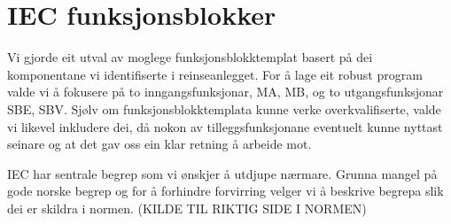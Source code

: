 \section{IEC funksjonsblokker} \label{IEC Seksjon}
\thispagestyle{fancy}

Vi gjorde eit utval av moglege funksjonsblokktemplat basert på dei komponentane vi identifiserte i reinseanlegget.
For å lage eit robust program valde vi å fokusere på to inngangsfunksjonar, \gls{MA}, \gls{MB}, og to utgangsfunksjonar \gls{SBE}, \gls{SBV}.
Sjølv om funksjonsblokktemplata kunne verke overkvalifiserte, valde vi likevel inkludere dei, då nokon av tilleggsfunksjonane eventuelt kunne nyttast seinare
og at det gav oss ein klar retning å arbeide mot.

\gls{IEC} har sentrale begrep som vi ønskjer å utdjupe nærmare. Grunna mangel på gode norske begrep
og for å forhindre forvirring velger vi å beskrive begrepa slik dei er skildra i normen. (KILDE TIL RIKTIG SIDE I NORMEN)

